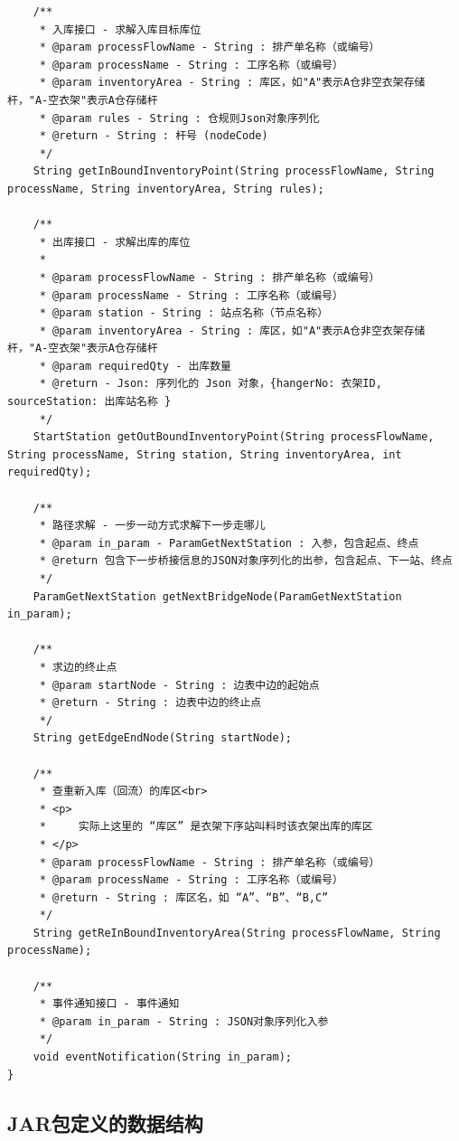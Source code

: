 \begin{lstlisting}
    /**
     * 入库接口 - 求解入库目标库位
     * @param processFlowName - String : 排产单名称（或编号）
     * @param processName - String : 工序名称（或编号）
     * @param inventoryArea - String : 库区，如"A"表示A仓非空衣架存储杆，"A-空衣架"表示A仓存储杆
     * @param rules - String : 仓规则Json对象序列化
     * @return - String : 杆号 (nodeCode)
     */
    String getInBoundInventoryPoint(String processFlowName, String processName, String inventoryArea, String rules);

    /**
     * 出库接口 - 求解出库的库位
     *
     * @param processFlowName - String : 排产单名称（或编号）
     * @param processName - String : 工序名称（或编号）
     * @param station - String : 站点名称（节点名称）
     * @param inventoryArea - String : 库区，如"A"表示A仓非空衣架存储杆，"A-空衣架"表示A仓存储杆
     * @param requiredQty - 出库数量
     * @return - Json: 序列化的 Json 对象，{hangerNo: 衣架ID, sourceStation: 出库站名称 }
     */
    StartStation getOutBoundInventoryPoint(String processFlowName, String processName, String station, String inventoryArea, int requiredQty);

    /**
     * 路径求解 - 一步一动方式求解下一步走哪儿
     * @param in_param - ParamGetNextStation : 入参，包含起点、终点
     * @return 包含下一步桥接信息的JSON对象序列化的出参，包含起点、下一站、终点
     */
    ParamGetNextStation getNextBridgeNode(ParamGetNextStation in_param);

    /**
     * 求边的终止点
     * @param startNode - String : 边表中边的起始点
     * @return - String : 边表中边的终止点
     */
    String getEdgeEndNode(String startNode);

    /**
     * 查重新入库（回流）的库区<br>
     * <p>
     *     实际上这里的 “库区” 是衣架下序站叫料时该衣架出库的库区
     * </p>
     * @param processFlowName - String : 排产单名称（或编号）
     * @param processName - String : 工序名称（或编号）
     * @return - String : 库区名，如 “A”、“B”、“B,C”
     */
    String getReInBoundInventoryArea(String processFlowName, String processName);

    /**
     * 事件通知接口 - 事件通知
     * @param in_param - String : JSON对象序列化入参
     */
    void eventNotification(String in_param);
}
\end{lstlisting}\vspace{-30pt}
\subsection{JAR包定义的数据结构}

